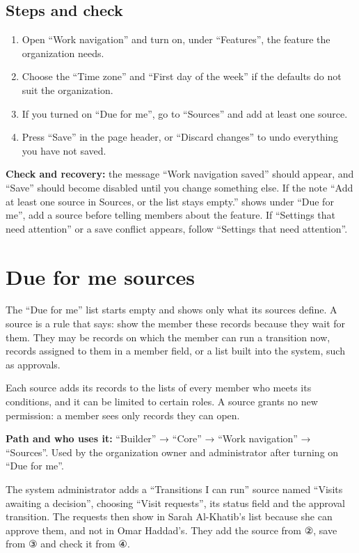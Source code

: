 \subsection{Steps and check}
\begin{enumerate}
\item Open “Work navigation” and turn on, under “Features”, the feature the organization needs.
\item Choose the “Time zone” and “First day of the week” if the defaults do not suit the organization.
\item If you turned on “Due for me”, go to “Sources” and add at least one source.
\item Press “Save” in the page header, or “Discard changes” to undo everything you have not saved.
\end{enumerate}

\textbf{Check and recovery:} the message “Work navigation saved” should appear, and “Save” should become disabled until you change something else. If the note “Add at least one source in Sources, or the list stays empty.” shows under “Due for me”, add a source before telling members about the feature. If “Settings that need attention” or a save conflict appears, follow “Settings that need attention”.

\clearpage
\section{Due for me sources}
\label{sec:builder-feature-work-navigation-sources}

The “Due for me” list starts empty and shows only what its sources define. A source is a rule that says: show the member these records because they wait for them. They may be records on which the member can run a transition now, records assigned to them in a member field, or a list built into the system, such as approvals.

Each source adds its records to the lists of every member who meets its conditions, and it can be limited to certain roles. A source grants no new permission: a member sees only records they can open.

\textbf{Path and who uses it:} “Builder” → “Core” → “Work navigation” → “Sources”. Used by the organization owner and administrator after turning on “Due for me”.

\begin{rcnote}
The system administrator adds a “Transitions I can run” source named “Visits awaiting a decision”, choosing “Visit requests”, its status field and the approval transition. The requests then show in Sarah Al-Khatib's list because she can approve them, and not in Omar Haddad's. They add the source from ②, save from ③ and check it from ④.
\end{rcnote}

